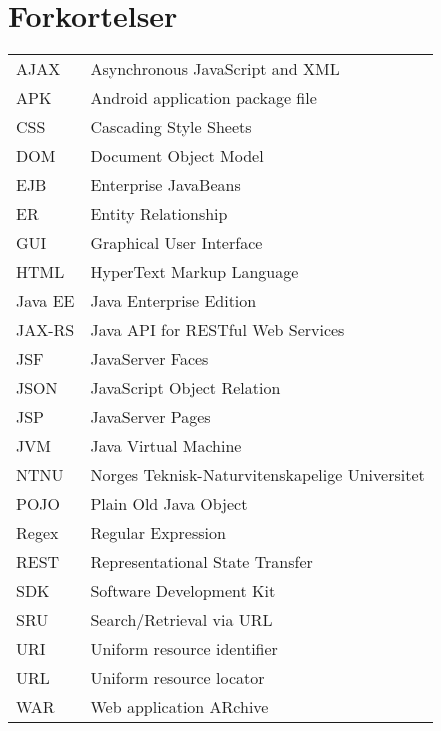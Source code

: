 \documentclass[../main.tex]{subfiles}
\begin{document}
\section*{Forkortelser}
\begin{tabular}{ p{2cm} l  }
AJAX	 & Asynchronous JavaScript and XML\\
APK & Android application package file\\
CSS & Cascading Style Sheets\\
DOM & Document Object Model\\
EJB & Enterprise JavaBeans\\
ER & Entity Relationship\\
GUI & Graphical User Interface\\
HTML & HyperText Markup Language\\
Java EE & Java Enterprise Edition\\
JAX-RS & Java API for RESTful Web Services\\
JSF & JavaServer Faces\\
JSON & JavaScript Object Relation\\
JSP & JavaServer Pages\\
JVM & Java Virtual Machine\\
NTNU & Norges Teknisk-Naturvitenskapelige Universitet\\
POJO & Plain Old Java Object\\
Regex & Regular Expression\\
REST & Representational State Transfer\\
SDK & Software Development Kit\\
SRU & Search/Retrieval via URL\\
URI & Uniform resource identifier\\
URL & Uniform resource locator\\
WAR & Web application ARchive\\
\end{tabular}


\newpage
\end{document}
